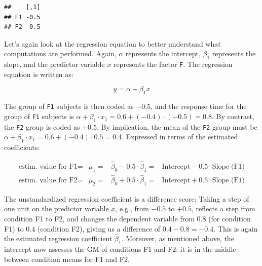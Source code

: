 \documentclass[
  12pt,
]{krantz}
\newenvironment{Shaded}{\begin{snugshade}}{\end{snugshade}}
\newcommand{\FunctionTok}[1]{\textcolor[rgb]{0.00,0.00,0.00}{#1}}
\newcommand{\NormalTok}[1]{#1}
\newcommand{\SpecialCharTok}[1]{\textcolor[rgb]{0.00,0.00,0.00}{#1}}
\theoremstyle{definition}
\theoremstyle{definition}
\theoremstyle{definition}
\theoremstyle{definition}
\theoremstyle{remark}
\begin{document}
\begin{Shaded}
\end{Shaded}

\begin{verbatim}
##    [,1]
## F1 -0.5
## F2  0.5
\end{verbatim}

Let's again look at the regression equation to better understand what computations are performed. Again, \(\alpha\) represents the intercept, \(\beta_1\) represents the slope, and the predictor variable \(x\) represents the factor \texttt{F}. The regression equation is written as:

\begin{equation}
y = \alpha + \beta_1x
\label{eq:lm2}
\end{equation}

The group of \texttt{F1} subjects is then coded as \(-0.5\), and the response time for the group of \texttt{F1} subjects is \(\alpha + \beta_1 \cdot x_1 = 0.6 + (-0.4) \cdot (-0.5) = 0.8\). By contrast, the \texttt{F2} group is coded as \(+0.5\). By implication, the mean of the \texttt{F2} group must be \(\alpha + \beta_1 \cdot x_1 = 0.6 + (-0.4) \cdot 0.5 = 0.4\).
Expressed in terms of the estimated coefficients:

\begin{equation}
\begin{array}{lccll}
\text{estim. value for F1} = & \hat{\mu}_1 = & \hat{\beta}_0 - 0.5 \cdot \hat{\beta}_1 = & \text{Intercept} - 0.5 \cdot \text{Slope (F1)}\\
\text{estim. value for F2} = & \hat{\mu}_2 = & \hat{\beta}_0 + 0.5 \cdot \hat{\beta}_1 = & \text{Intercept} + 0.5 \cdot \text{Slope (F1)}
\end{array}
\label{eq:predVal2}
\end{equation}

The unstandardized regression coefficient is a difference score: Taking a step of one unit on the predictor variable \(x\), e.g., from \(-0.5\) to \(+0.5\), reflects a step from condition F1 to F2, and changes the dependent variable from \(0.8\) (for condition F1) to \(0.4\) (condition F2), giving us a difference of \(0.4 - 0.8 = -0.4\). This is again the estimated regression coefficient \(\hat{\beta}_1\).
Moreover, as mentioned above, the intercept now assesses the GM of conditions F1 and F2: it is in the middle between condition means for F1 and F2.
\end{document}
